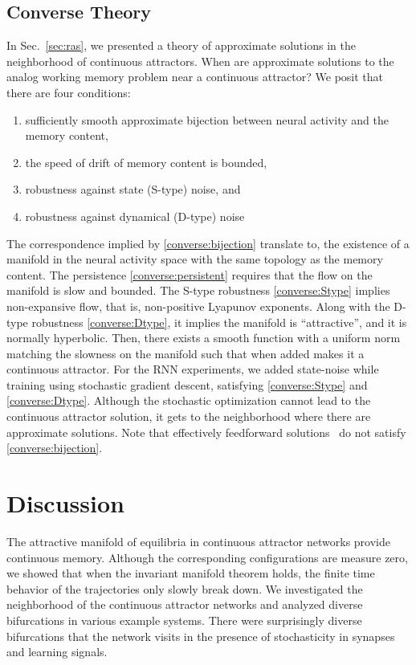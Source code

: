 \documentclass{article} %
\newcounter{ct}
\theoremstyle{definition}
\theoremstyle{remark}
\begin{document}
\subsection{Converse Theory}\label{sec:converse}
In Sec.~\ref{sec:ras}, we presented a theory of approximate solutions in the neighborhood of continuous attractors.
When are approximate solutions to the analog working memory problem near a continuous attractor?
We posit that there are four conditions:
\begin{enumerate}[label=\textbf{(C\arabic*)}]
\item sufficiently smooth approximate bijection between neural activity and the memory content, \label{converse:bijection}
\item the speed of drift of memory content is bounded, \label{converse:persistent}
\item robustness against state (S-type) noise, and \label{converse:Stype}
\item robustness against dynamical (D-type) noise \label{converse:Dtype}
\end{enumerate}
The correspondence implied by \ref{converse:bijection} translate to, the existence of a manifold in the neural activity space with the same topology as the memory content.
The persistence \ref{converse:persistent} requires that the flow on the manifold is slow and bounded.
The S-type robustness \ref{converse:Stype} implies non-expansive flow, that is, non-positive Lyapunov exponents.
Along with the D-type robustness \ref{converse:Dtype}, it implies the manifold is ``attractive'', and it is normally hyperbolic.
Then, there exists a smooth function with a uniform norm matching the slowness on the manifold such that when added makes it a continuous attractor.
For the RNN experiments, we added state-noise while training using stochastic gradient descent, satisfying \ref{converse:Stype} and \ref{converse:Dtype}.
Although the stochastic optimization cannot lead to the continuous attractor solution, it gets to the neighborhood where there are approximate solutions.
Note that effectively feedforward solutions~\citep{Goldman2009} do not satisfy \ref{converse:bijection}.

\section{Discussion}
The attractive manifold of equilibria in continuous attractor networks provide continuous memory.
Although the corresponding configurations are measure zero, we showed that  when the invariant manifold theorem holds, the finite time behavior of the trajectories only slowly break down.
We investigated the neighborhood of the continuous attractor networks and analyzed diverse bifurcations in various example systems.
There were surprisingly diverse bifurcations that the network visits in the presence of stochasticity in synapses and learning signals.
\end{document}
